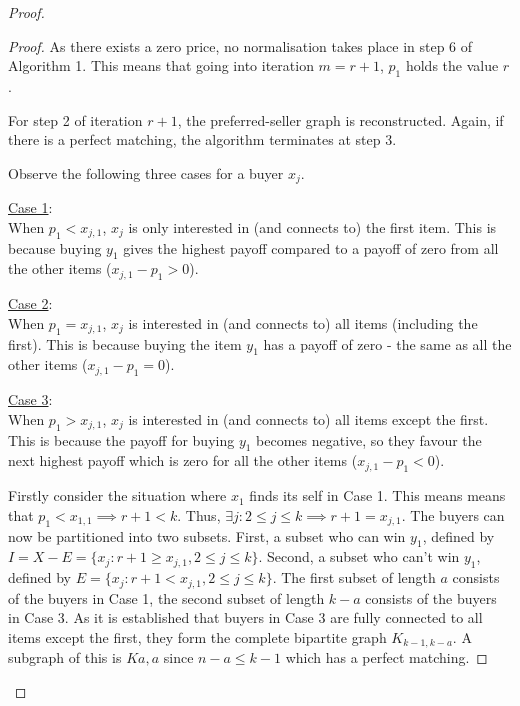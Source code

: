 \begin{enumerate}
\begin{proof}
\begin{proof}
            As there exists a zero price, no normalisation takes place in step 6 of Algorithm 1.
            This means that going into iteration $m = r + 1$, $p_1$ holds the value $r$.

            For step 2 of iteration $r + 1$, the preferred-seller graph is reconstructed.
            Again, if there is a perfect matching, the algorithm terminates at step 3.

            Observe the following three cases for a buyer $x_j$.

            \underline{Case 1}: \\
            When $p_1 < x_{j,1}$, $x_j$ is only interested in (and connects to) the first item.
            This is because buying $y_1$ gives the highest payoff compared to a payoff of zero from all the other items ($x_{j,1} - p_1 > 0$).

            \underline{Case 2}: \\
            When $p_1 = x_{j,1}$, $x_j$ is interested in (and connects to) all items (including the first).
            This is because buying the item $y_1$ has a payoff of zero - the same as all the other items ($x_{j,1} - p_1 = 0$).

            \underline{Case 3}: \\
            When $p_1 > x_{j,1}$, $x_j$ is interested in (and connects to) all items except the first.
            This is because the payoff for buying $y_1$ becomes negative, so they favour the next highest payoff which is zero for all the other items ($x_{j,1} - p_1 < 0$).


            Firstly consider the situation where $x_1$ finds its self in Case 1.
            This means means that $p_1 < x_{1, 1} \implies r + 1 < k$.
            Thus, $\exists j : 2 \leq j \leq k \implies r + 1 = x_{j, 1}$.
            The buyers can now be partitioned into two subsets.
            First, a subset who can win $y_1$, defined by $I = X - E = \{x_j : r + 1 \geq x_{j, 1}, 2 \leq j \leq k\}$.
            Second, a subset who can't win $y_1$, defined by $E = \{x_j : r + 1 < x_{j, 1}, 2 \leq j \leq k\}$.
            The first subset of length $a$ consists of the buyers in Case 1, the second subset of length $k - a$ consists of the buyers in Case 3.
            As it is established that buyers in Case 3 are fully connected to all items except the first, they form the complete bipartite graph $K_{k - 1, k - a}$.
            A subgraph of this is $K{a, a}$ since $n - a \leq k - 1$ which has a perfect matching.


\end{proof}
\end{proof}
\end{enumerate}
